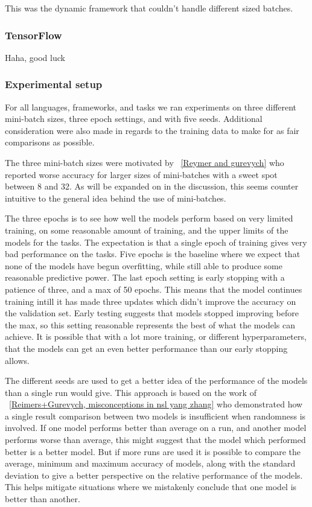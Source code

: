 This was the dynamic framework that couldn't handle different sized batches.


\subsubsection*{TensorFlow}

Haha, good luck



\subsubsection{Experimental setup}

For all languages, frameworks, and tasks we ran experiments on three different
mini-batch sizes, three epoch settings, and with five seeds. Additional
consideration were also made in regards to the training data to make for as fair
comparisons as possible.

The three mini-batch sizes were motivated by ~\ref{Reymer and gurevych} who
reported worse accuracy for larger sizes of mini-batches with a sweet spot
between 8 and 32. As will be expanded on in the discussion, this seems counter
intuitive to the general idea behind the use of mini-batches. %

The three epochs is to see how well the models perform based on very limited
training, on some reasonable amount of training, and the upper limits of the
models for the tasks. The expectation is that a single epoch of training gives
very bad performance on the tasks. Five epochs is the baseline where we expect
that none of the models have begun overfitting, while still able to produce some
reasonable predictive power. The last epoch setting is early stopping with a
patience of three, and a max of 50 epochs. This means that the model continues
training intill it has made three updates which didn't improve the accuracy on
the validation set. Early testing suggests that models stopped improving before
the max, so this setting reasonable represents the best of what the models can
achieve. It is possible that with a lot more training, or different
hyperparameters, that the models can get an even better performance than our
early stopping allows.

The different seeds are used to get a better idea of the performance of the
models than a single run would give. This approach is based on the work of
~\ref{Reimers+Gurevych, misconceptions in nsl yang zhang} who demonstrated how a
single result comparison between two models is insufficient when randomness is
involved. If one model performs better than average on a run, and another model
performs worse than average, this might suggest that the model which performed
better is a better model. But if more runs are used it is possible to compare
the average, minimum and maximum accuracy of models, along with the standard
deviation to give a better perspective on the relative performance of the
models. This helps mitigate situations where we mistakenly conclude that one
model is better than another.

